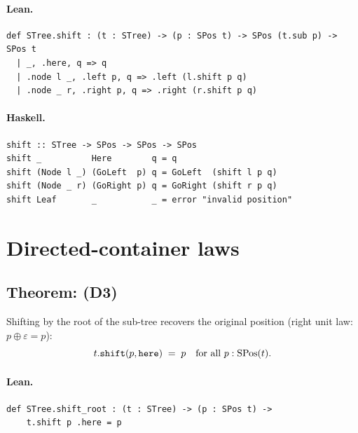 \documentclass[11pt,a4paper]{article}
\begin{document}
\paragraph{Lean.}
\begin{lstlisting}[style=lean]
def STree.shift : (t : STree) -> (p : SPos t) -> SPos (t.sub p) -> SPos t
  | _, .here, q => q
  | .node l _, .left p, q => .left (l.shift p q)
  | .node _ r, .right p, q => .right (r.shift p q)
\end{lstlisting}

\paragraph{Haskell.}
\begin{lstlisting}[style=haskell]
shift :: STree -> SPos -> SPos -> SPos
shift _          Here        q = q
shift (Node l _) (GoLeft  p) q = GoLeft  (shift l p q)
shift (Node _ r) (GoRight p) q = GoRight (shift r p q)
shift Leaf       _           _ = error "invalid position"
\end{lstlisting}


\section{Directed-container laws}

\subsection{Theorem:  (D3)}

\begin{thm}
Shifting by the root of the sub-tree recovers the original position (right
unit law: $p \oplus \varepsilon = p$):
\[
  t.\texttt{shift}(p, \texttt{here}) \;=\; p
  \quad\text{for all } p : \mathrm{SPos}(t).
\]
\end{thm}

\paragraph{Lean.}
\begin{lstlisting}[style=lean]
def STree.shift_root : (t : STree) -> (p : SPos t) ->
    t.shift p .here = p
\end{lstlisting}
\end{document}
